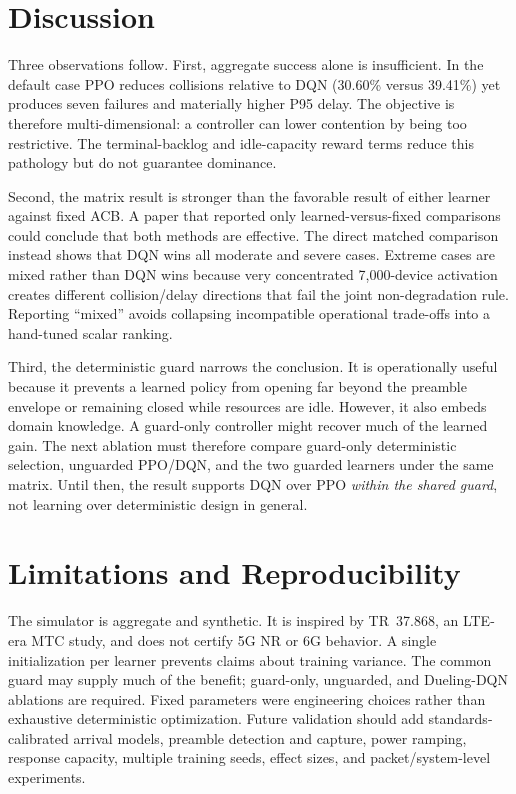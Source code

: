 \documentclass[conference]{IEEEtran}
\begin{document}
\section{Discussion}
Three observations follow. First, aggregate success alone is insufficient. In the default case PPO reduces collisions relative to DQN (30.60\% versus 39.41\%) yet produces seven failures and materially higher P95 delay. The objective is therefore multi-dimensional: a controller can lower contention by being too restrictive. The terminal-backlog and idle-capacity reward terms reduce this pathology but do not guarantee dominance.

Second, the matrix result is stronger than the favorable result of either learner against fixed ACB. A paper that reported only learned-versus-fixed comparisons could conclude that both methods are effective. The direct matched comparison instead shows that DQN wins all moderate and severe cases. Extreme cases are mixed rather than DQN wins because very concentrated 7,000-device activation creates different collision/delay directions that fail the joint non-degradation rule. Reporting ``mixed'' avoids collapsing incompatible operational trade-offs into a hand-tuned scalar ranking.

Third, the deterministic guard narrows the conclusion. It is operationally useful because it prevents a learned policy from opening far beyond the preamble envelope or remaining closed while resources are idle. However, it also embeds domain knowledge. A guard-only controller might recover much of the learned gain. The next ablation must therefore compare guard-only deterministic selection, unguarded PPO/DQN, and the two guarded learners under the same matrix. Until then, the result supports DQN over PPO \emph{within the shared guard}, not learning over deterministic design in general.

\section{Limitations and Reproducibility}
The simulator is aggregate and synthetic. It is inspired by TR~37.868, an LTE-era MTC study, and does not certify 5G NR or 6G behavior. A single initialization per learner prevents claims about training variance. The common guard may supply much of the benefit; guard-only, unguarded, and Dueling-DQN ablations are required. Fixed parameters were engineering choices rather than exhaustive deterministic optimization. Future validation should add standards-calibrated arrival models, preamble detection and capture, power ramping, response capacity, multiple training seeds, effect sizes, and packet/system-level experiments.
\end{document}
